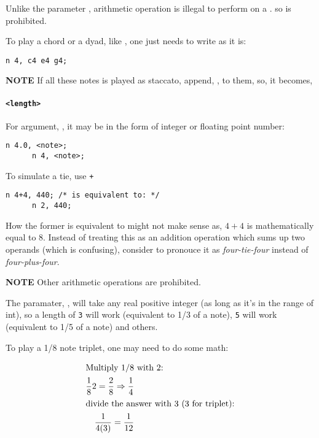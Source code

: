 \np Unlike the parameter , arithmetic operation is illegal
to perform on a . so  is prohibited.

\np To play a chord or a dyad, like , one just needs to write as it is:

\begin{Verbatim}[frame=single]
      n 4, c4 e4 g4;
\end{Verbatim}

\textbf{NOTE} If all these notes is played as staccato, append,
, to them, so, it becomes, 

\paragraph{\texttt{<length>}} For argument, , it may be in the form of integer or floating point number:
\label{nlength}

\begin{Verbatim}[frame=single]
      n 4.0, <note>;
      n 4, <note>;
\end{Verbatim}

\np To simulate a tie, use \verb-+-

\begin{Verbatim}[frame=single]
      n 4+4, 440; /* is equivalent to: */
      n 2, 440; 
\end{Verbatim}

\np How the former is equivalent to  might
not make sense as, $4+4$ is mathematically equal to 8. Instead
of treating this as an addition operation which sums up two
operands (which is confusing), consider to pronouce it as
\textit{four-tie-four} instead of \textit{four-plus-four}.
 
\textbf{NOTE} Other arithmetic operations are prohibited.

\np The paramater, , will take any real positive integer (as long as it's in the range of int),
so a length of \verb+3+ will work (equivalent to 1/3 of a note), \verb+5+ will work (equivalent to 1/5
of a note) and others.

\np To play a 1/8 note triplet, one may need to do some math:

\begin{align}
	\shortintertext{Multiply 1/8 with 2:}
	\frac{1}{8}2 = \frac{2}{8} \Rightarrow \frac{1}{4} \\
	\shortintertext{divide the answer with 3 (3 for triplet):}
	\frac{1}{4(3)} = \frac{1}{12}
\end{align}

